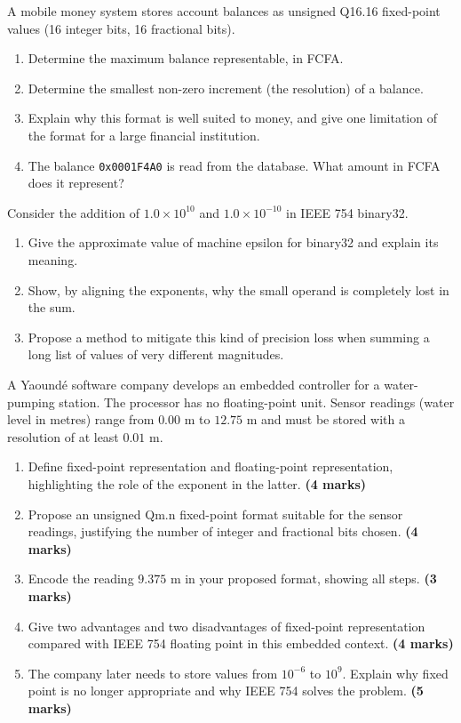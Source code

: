 \documentclass[11pt]{article}
\newcounter{popsec}
\newcounter{popsub}
\newcommand{\courssub}[1]{%
  \stepcounter{popsub}%
  \par\vspace{9pt}\noindent{\popxbold\fontsize{11.5}{13}\selectfont\color{popink}{\color{poporange}\thepopsec.\thepopsub}\hspace{6pt}#1}\par\nopagebreak\vspace{4pt}
}
\begin{document}
\begin{exercice}
A mobile money system stores account balances as unsigned Q16.16 fixed-point values (16 integer bits, 16 fractional bits).
\begin{enumerate}
\item Determine the maximum balance representable, in FCFA.
\item Determine the smallest non-zero increment (the resolution) of a balance.
\item Explain why this format is well suited to money, and give one limitation of the format for a large financial institution.
\item The balance \texttt{0x0001F4A0} is read from the database. What amount in FCFA does it represent?
\end{enumerate}
\end{exercice}

\begin{exercice}
Consider the addition of $1.0\times 10^{10}$ and $1.0\times 10^{-10}$ in IEEE 754 binary32.
\begin{enumerate}
\item Give the approximate value of machine epsilon for binary32 and explain its meaning.
\item Show, by aligning the exponents, why the small operand is completely lost in the sum.
\item Propose a method to mitigate this kind of precision loss when summing a long list of values of very different magnitudes.
\end{enumerate}
\end{exercice}

\courssub{I prepare for the GCE}

\begin{exercice}
A Yaoundé software company develops an embedded controller for a water-pumping station. The processor has no floating-point unit. Sensor readings (water level in metres) range from $0.00$ m to $12.75$ m and must be stored with a resolution of at least $0.01$ m.
\begin{enumerate}
\item Define fixed-point representation and floating-point representation, highlighting the role of the exponent in the latter. \textbf{(4 marks)}
\item Propose an unsigned Qm.n fixed-point format suitable for the sensor readings, justifying the number of integer and fractional bits chosen. \textbf{(4 marks)}
\item Encode the reading $9.375$ m in your proposed format, showing all steps. \textbf{(3 marks)}
\item Give two advantages and two disadvantages of fixed-point representation compared with IEEE 754 floating point in this embedded context. \textbf{(4 marks)}
\item The company later needs to store values from $10^{-6}$ to $10^{9}$. Explain why fixed point is no longer appropriate and why IEEE 754 solves the problem. \textbf{(5 marks)}
\end{enumerate}
\end{exercice}
\end{document}
